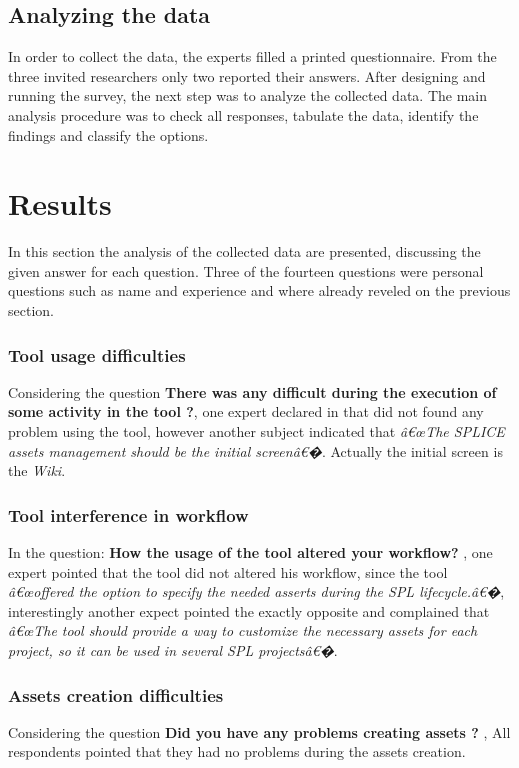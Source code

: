 \subsection{Analyzing the data}

In  order  to  collect  the  data, the  experts  filled a printed questionnaire.  From the  three  invited  researchers  only  two  reported  their  answers. 
After designing and running the survey, the next step was to analyze the collected data. The main analysis procedure was to check all responses, tabulate the data, identify the findings and classify the options. 

\section{Results}
\label{sc:datacollection}

In  this  section  the  analysis  of  the  collected  data  are  presented, discussing  the  given  answer  for  each  question. Three of the fourteen questions were personal questions such as name and experience and where already reveled on the previous section.

\subsubsection{Tool usage difficulties}
Considering the question \textbf{There was any difficult during the execution of some activity in the tool ?},  one expert declared in that did not found any problem using the tool, however another subject indicated that \textit{â€œThe SPLICE assets management should be the initial screenâ€�}. Actually the initial screen is the \textit{Wiki}.

\subsubsection {Tool interference in workflow}
In the question:  \textbf{How the usage of the tool altered your workflow? }, one expert pointed that the tool did not altered his workflow, since the tool \textit{â€œoffered the option to specify the needed asserts during the SPL lifecycle.â€�}, interestingly another expect pointed the exactly opposite and complained that \textit{â€œThe tool should provide a way to customize the necessary assets for each project, so it can be used in several SPL projectsâ€�}.


\subsubsection{Assets creation difficulties}
Considering the question \textbf{Did you have any problems creating assets ?} , 
All respondents pointed that they had no problems during the assets creation.

